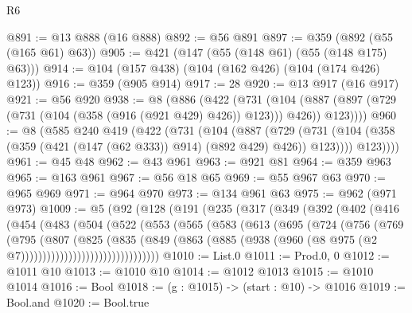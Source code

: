 \begin{lexlean}{R6}
\begin{coremodule}
@891 := @13 @888 (@16 @888)
@892 := @56 @891
@897 := @359 (@892 (@55 (@165 @61) @63))
@905 := @421 (@147 (@55 (@148 @61) (@55 (@148 @175) @63)))
@914 := @104 (@157 @438) (@104 (@162 @426) (@104 (@174 @426) @123))
@916 := @359 (@905 @914)
@917 := 28
@920 := @13 @917 (@16 @917)
@921 := @56 @920
@938 := @8
    (@886
      (@422
        (@731
          (@104 (@887 (@897 (@729 (@731 (@104 (@358 (@916 (@921 @429) @426)) @123))) @426)) @123))))
@960 := @8
    (@585
      @240
      @419
      (@422
        (@731
          (@104
            (@887
              (@729
                (@731 (@104 (@358 (@359 (@421 (@147 (@62 @333)) @914) (@892 @429) @426)) @123))))
            @123))))
@961 := @45 @48
@962 := @43 @961
@963 := @921 @81
@964 := @359 @963
@965 := @163 @961
@967 := @56 @18 @65
@969 := @55 @967 @63
@970 := @965 @969
@971 := @964 @970
@973 := @134 @961 @63
@975 := @962 (@971 @973)
@1009 := @5
    (@92
      (@128
        (@191
          (@235
            (@317
              (@349
                (@392
                  (@402
                    (@416
                      (@454
                        (@483
                          (@504
                            (@522
                              (@553
                                (@565
                                  (@583
                                    (@613
                                      (@695
                                        (@724
                                          (@756
                                            (@769
                                              (@795
                                                (@807
                                                  (@825
                                                    (@835
                                                      (@849
                                                        (@863
                                                          (@885
                                                            (@938
                                                              (@960
                                                                (@8
                                                                  @975
                                                                  (@2
                                                                    @7))))))))))))))))))))))))))))))))
@1010 := List.{0}
@1011 := Prod.{0, 0}
@1012 := @1011 @10
@1013 := @1010 @10
@1014 := @1012 @1013
@1015 := @1010 @1014
@1016 := Bool
@1018 := (g : @1015) -> (start : @10) -> @1016
@1019 := Bool.and
@1020 := Bool.true

\end{coremodule}
\end{lexlean}
